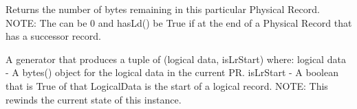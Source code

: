 \documentclass[letterpaper,10pt,english]{sphinxmanual}
\begin{document}
\begin{fulllineitems}
\begin{fulllineitems}
\end{fulllineitems}


\begin{fulllineitems}
\label{\detokenize{ref/LIS/core/PhysRec:TotalDepth.LIS.core.PhysRec.PhysRecRead.ldRemaingInPr}}
Returns the number of bytes remaining in this particular Physical
Record. NOTE: The can be 0 and hasLd() be True if at the end of a
Physical Record that has a successor record.

\end{fulllineitems}


\begin{fulllineitems}
\label{\detokenize{ref/LIS/core/PhysRec:TotalDepth.LIS.core.PhysRec.PhysRecRead.genLd}}
A generator that produces a tuple of (logical data, isLrStart)
where:
logical data - A bytes() object for the logical data in the current PR.
isLrStart - A boolean that is True of that LogicalData is the start of
a logical record.
NOTE: This rewinds the current state of this instance.

\end{fulllineitems}


\end{fulllineitems}

\end{document}
